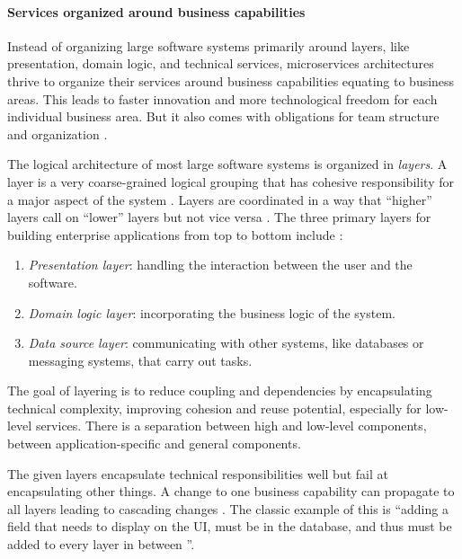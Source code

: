 \paragraph{Services organized around business capabilities}
\label{bac:businessCapability} 
Instead of organizing large software systems primarily around layers, like presentation, domain logic, and technical services, microservices architectures thrive to organize their services around business capabilities equating to business areas. 
This leads to faster innovation and more technological freedom for each individual business area. 
But it also comes with obligations for team structure and organization \citep[p. 5, p. 21]{Wolff2016} \cite{FowlerFowlerBusinessCap2014}.

The logical architecture of most large software systems is organized in \textit{layers}.
A layer is a very coarse-grained logical grouping that has cohesive responsibility for a major aspect of the system \citep[p. 199 f.]{Larman2004}.
Layers are coordinated in a way that ``higher'' layers call on ``lower'' layers but not vice versa \citep[p. 199 f.]{Larman2004}.
The three primary layers for building enterprise applications from top to bottom include \citep[p. 19 f.]{Fowler2002}:
\begin{enumerate}
\item \textit{Presentation layer}: handling the interaction between the user and the software.
\item \textit{Domain logic layer}: incorporating the business logic of the system.
\item \textit{Data source layer}: communicating with other systems, like databases or messaging systems, that carry out tasks.
\end{enumerate}

The goal of layering is to reduce coupling and dependencies by encapsulating technical complexity, improving cohesion and reuse potential, especially for low-level services.
There is a separation between high and low-level components, between application-specific and general components.
\citep[p. 204 f.]{Larman2004}

The given layers encapsulate technical responsibilities well but fail at encapsulating other things.
A change to one business capability can propagate to all layers leading to cascading changes \citep[p. 18]{Fowler2002}.
The classic example of this is ``adding a field that needs to display on the \ac{UI}, must be in the database, and thus must be added to every layer in between \citep[p. 18]{Fowler2002}''.

